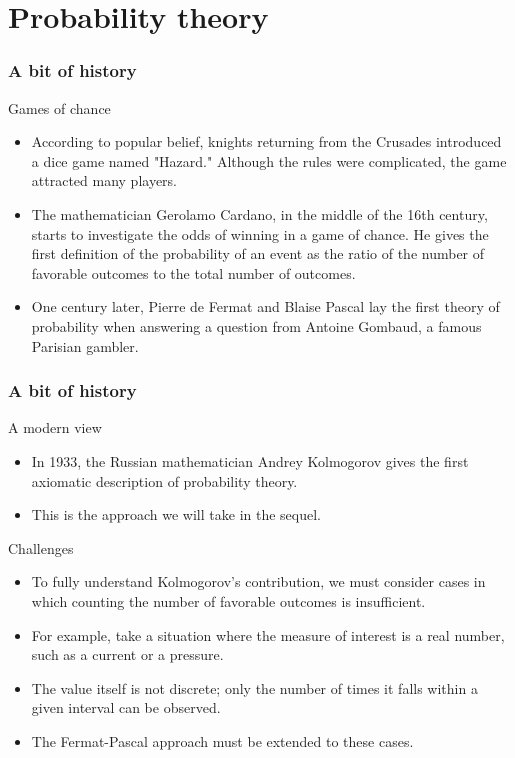 \documentclass[main.tex]{subfiles}
\begin{document}
\section{Probability theory}

\begin{frame}
    \frametitle{A bit of history}
\begin{block}{Games of chance}
    \begin{itemize}
        \item<+-> According to popular belief, knights returning from the Crusades introduced a dice game named "Hazard."
         Although the rules were complicated, the game attracted many players.
        \item<+-> The mathematician Gerolamo Cardano, in the middle of the 16th century, starts to investigate the odds of winning
        in a game of chance. He gives the first definition of the probability of an event as the ratio of
        the number of favorable outcomes to the total number of outcomes.
        \item<+-> One century later, Pierre de Fermat and Blaise Pascal lay the first theory of probability when
        answering a question from Antoine Gombaud, a famous Parisian gambler.
    \end{itemize}
\end{block}
\end{frame}
\begin{frame}
    \frametitle{A bit of history}
\begin{block}{A modern view}
    \begin{itemize}
        \item<+-> In 1933, the Russian mathematician Andrey Kolmogorov gives the first axiomatic description of probability theory.
        \item<+-> This is the approach we will take in the sequel.
    \end{itemize}
\end{block}    
\begin{block}{Challenges}
    \begin{itemize}
       \item<+-> To fully understand Kolmogorov's contribution, we must consider cases in which counting the number of favorable outcomes is insufficient.
       \item<+-> For example, take a situation where the measure of interest is a real number, such as a current or a pressure.
       \item<+-> The value itself is not discrete; only the number of times it falls within a given interval can be observed.
       \item<+-> The Fermat-Pascal approach must be extended to these cases.
    \end{itemize}
\end{block}    
\end{frame}
\end{document}
